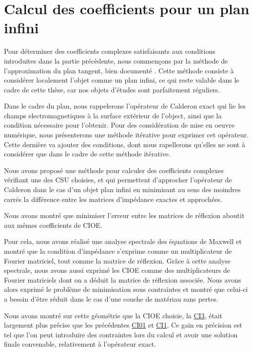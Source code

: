 \chapter{Calcul des coefficients pour un plan infini}
\label{sec:plan}
\minitoc
\newpage

Pour déterminer des coefficients complexes satisfaisants aux conditions introduites dans la partie précèdente, nous commençons par la méthode de l'approximation du plan tangent, bien documenté \cite{hoppe_impedance_1995,marceaux_high-order_2000,aubakirov_electromagnetic_2014}. Cette méthode consiste à considérer localement l'objet comme un plan infini, ce qui reste valable dans le cadre de cette thèse, car nos objets d'études sont parfaitement réguliers.

Dans le cadre du plan, nous rappelerons l'opérateur de Calderon exact qui lie les champs electromagnetiques à la surface extérieur de l'object, ainsi que la condition nécessaire pour l'obtenir.
Pour des considération de mise en oeuvre numérique, nous présenterons une méthode itérative pour exprimer cet opérateur.
Cette dernière va ajouter des conditions, dont nous rapellerons qu'elles ne sont à considérer que dans le cadre de cette méthode itérative.








Nous avons proposé une méthode pour calculer des coefficients complexes vérifiant une des CSU choisies, et qui permettent d'approcher l'opérateur de Calderon dans le cas d'un objet plan infini en minimisant au sens des moindres carrés la différence entre les matrices d'impédance exactes et approchées.

Nous avons montré que minimiser l'erreur entre les matrices de réflexion aboutit aux mêmes coefficients de CIOE.

Pour cela, nous avons réalisé une analyse spectrale des équations de Maxwell et montré que la condition d'impédance s'exprime comme un multiplicateur de Fourier matriciel, tout comme la matrice de réflexion. Grâce à cette analyse spectrale, nous avons aussi exprimé les CIOE comme des multiplicateurs de Fourier matriciels dont on a déduit la matrice de réflexion associée. Nous avons alors exprimé le problème de minimisation sous contraintes et montré que celui-ci a besoin d'être réduit dans le cas d'une couche de matériau sans pertes.

Nous avons montré sur cette géométrie que la CIOE choisie, la \hyperlink{ci3}{CI3}, était largement plus précise que les précédentes \hyperlink{ci01}{CI01} et \hyperlink{ci1}{CI1}. Ce gain en précision est tel que l'on peut introduire des contraintes lors du calcul et avoir une solution finale convenable, relativement à l'opérateur exact.
